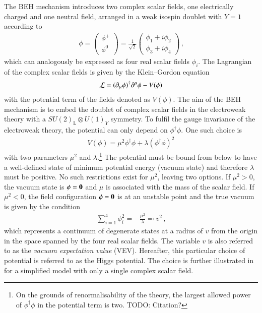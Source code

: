The BEH mechanism introduces two complex scalar fields, one electrically charged
and one neutral field, arranged in a weak isospin doublet with $Y = 1$ according
to
\begin{align*}
  \phi =
  \begin{pmatrix}
    \phi^+ \\
    \phi^0
  \end{pmatrix}
  = \frac{1}{\sqrt{2}}
  \begin{pmatrix}
    \phi_1 + i \phi_2 \\
    \phi_3 + i \phi_4
  \end{pmatrix} \,\text{,}
\end{align*}
which can analogously be expressed as four real scalar fields $\phi_i$. The
Lagrangian of the complex scalar fields is given by the Klein--Gordon equation
\begin{align*}
  \mathcal{L} = (\partial_\mu \phi)^\dagger \partial^\mu \phi - V(\phi)
\end{align*}
with the potential term of the fields denoted as $V(\phi)$. The aim of the BEH
mechanism is to embed the doublet of complex scalar fields in the electroweak
theory with a $SU(2)_{\text{L}}\otimes U(1)_Y$ symmetry. To fulfil the gauge
invariance of the electroweak theory, the potential can only depend on
$\phi^\dagger \phi$. One such choice is
\begin{align}
  V(\phi) = \mu^2 \phi^\dagger \phi + \lambda (\phi^\dagger \phi)^2
  \label{eq:higgs_potential}
\end{align}
with two parameters $\mu^2$ and $\lambda$.\footnote{On the grounds of
  renormalisability of the theory, the largest allowed power of
  $\phi^\dagger \phi$ in the potential term is two. TODO: Citation?} The
potential must be bound from below to have a well-defined state of minimum
potential energy (vacuum state) and therefore $\lambda$ must be positive. No
such restrictions exist for $\mu^2$, leaving two options. If $\mu^2 > 0$, the
vacuum state is $\phi = \myvec{0}$ and $\mu$ is associated with the mass of the
scalar field. If $\mu^2 < 0$, the field configuration $\phi = \myvec{0}$ is at
an unstable point and the true vacuum is given by the condition
\begin{align*}
  \sum_{i = 1}^4 \phi_i^2 = -\frac{\mu^2}{\lambda} \eqqcolon v^2 \,\text{,}
\end{align*}
which represents a continuum of degenerate states at a radius of $v$ from the
origin in the space spanned by the four real scalar fields. The variable $v$ is
also referred to as the \emph{vacuum expectation value} (VEV). Hereafter, this
particular choice of potential is referred to as the Higgs potential. The choice
is further illustrated in  for a simplified model with
only a single complex scalar field.

